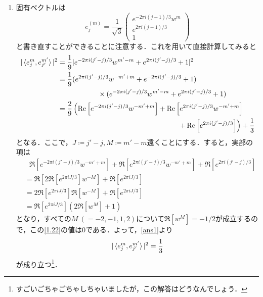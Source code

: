 \documentclass[a4paper,pdflatex,ja=standard]{bxjsarticle}
\begin{document}
\begin{enumerate}
  \item 
  固有ベクトルは
  \begin{equation}
    e_{j}^{(m)}
    =
    \frac{1}{\sqrt{3}}
    \begin{pmatrix}
      e^{-2\pi i(j-1)/3}w^{m} \\
      e^{2\pi i(j-1)/3} \\
      1
    \end{pmatrix}
  \end{equation}
  と書き直すことができることに注意する．これを用いて直接計算してみると
  \begin{align}
    |\ev*{e_{j}^{m},e_{j'}^{m'}}|^2
    &=
    \frac{1}{9}
    | e^{-2\pi i(j'-j)/3}w^{m'-m}+e^{2\pi i(j'-j)/3}+ 1 |^2
    \nonumber
    \\
    &=
    \frac{1}{9}
    ( e^{2\pi i(j'-j)/3}w^{-m'+m}+e^{-2\pi i(j'-j)/3}+ 1 )
    \nonumber
    \\
    &\hspace*{2cm}
    \times( e^{-2\pi i(j'-j)/3}w^{m'-m}+e^{2\pi i(j'-j)/3}+ 1 )
    \nonumber
    \\
    &=
    \frac{2}{9}
    \left( \Re\left[ e^{-2\pi i(j'-j)/3}w^{-m'+m} \right]
    +
    \Re\left[ e^{2\pi i(j'-j)/3}w^{-m'+m} \right]
    \right.
    \nonumber
    \\
    &\hspace*{6cm}
    \left.
    +
    \Re\left[ e^{2\pi i(j'-j)/3} \right]
    \right)
    +
    \frac{1}{3}
    \label{ans1}
  \end{align}
  となる．ここで，$J\coloneqq j'-j, M\coloneqq m'-m$遠くことにする．すると，実部の項は
  \begin{align}
    &\ \ \ 
    \Re\left[ e^{-2\pi i(j'-j)/3}w^{-m'+m} \right]
    +
    \Re\left[ e^{2\pi i(j'-j)/3}w^{-m'+m} \right]
    +
    \Re\left[ e^{2\pi i(j'-j)/3} \right]
    \nonumber
    \\
    &=
    \Re\left[ 2\Re\left[ e^{2\pi iJ/3} \right]w^{-M} \right]
    +
    \Re\left[ e^{2\pi iJ/3} \right]
    \nonumber
    \\
    &=
    2\Re\left[ e^{2\pi iJ/3} \right]\Re\left[ w^{-M} \right]
    +
    \Re\left[ e^{2\pi iJ/3} \right]
    \nonumber
    \\
    &=
    \Re\left[ e^{2\pi iJ/3} \right]
    \left( 2\Re\left[ w^{M} \right] + 1\right)
    \label{1.22}
  \end{align}
  となり，すべての$M\ (=-2,-1,1,2)$について$\Re\left[ w^{M} \right]=-1/2$が成立するので，この\eqref{1.22}の値は0である．よって，\eqref{ans1}より
  \begin{equation}
    |\ev*{e_{j}^{m},e_{j'}^{m'}}|^2
    =
    \frac{1}{3}
  \end{equation}
  が成り立つ\footnote{
    すごいごちゃごちゃしちゃいましたが，この解答はどうなんでしょう．
  }．

\end{enumerate}
\end{document}
